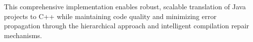 


This comprehensive implementation enables robust, scalable translation of Java projects to C++ while maintaining code quality and minimizing error propagation through the hierarchical approach and intelligent compilation repair mechanisms.